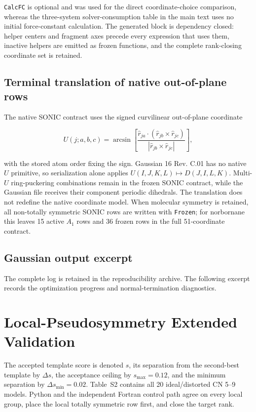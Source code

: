 \documentclass[10pt]{article}
\begin{document}
\texttt{CalcFC} is optional and was used for the direct coordinate-choice
comparison, whereas the three-system solver-consumption table in the main text
uses no initial force-constant calculation.  The generated block is dependency
closed: helper centers and fragment axes precede every expression that uses
them, inactive helpers are emitted as frozen functions, and the complete
rank-closing coordinate set is retained.

\subsection{Terminal translation of native out-of-plane rows}

The native SONIC contract uses the signed curvilinear out-of-plane coordinate

\[
U(j;a,b,c)=\arcsin\!\left[
\frac{\hat r_{ja}\cdot(\hat r_{jb}\times\hat r_{jc})}
{|\hat r_{jb}\times\hat r_{jc}|}\right],
\]

with the stored atom order fixing the sign.  Gaussian 16 Rev. C.01 has no
native \(U\) primitive, so serialization alone applies
\(U(I,J,K,L)\mapsto D(J,I,L,K)\).  Multi-\(U\) ring-puckering combinations
remain in the frozen SONIC contract, while the Gaussian file receives their
component periodic dihedrals.  The translation does not redefine the native
coordinate model.  When molecular symmetry is retained, all non-totally
symmetric SONIC rows are written with \texttt{Frozen}; for norbornane this
leaves 15 active \(A_1\) rows and 36 frozen rows in the full 51-coordinate
contract.

\subsection{Gaussian output excerpt}

The complete log is retained in the reproducibility archive.  The following
excerpt records the optimization progress and normal-termination diagnostics.



\section{Local-Pseudosymmetry Extended Validation}

The accepted template score is denoted \(s\), its separation from the
second-best template by \(\Delta s\), the acceptance ceiling by
\(s_{\max}=0.12\), and the minimum separation by
\(\Delta s_{\min}=0.02\).  Table~S2 contains all 20 ideal/distorted CN 5--9
models.  Python and the independent Fortran control path agree on every local
group, place the local totally symmetric row first, and close the target rank.
\end{document}
